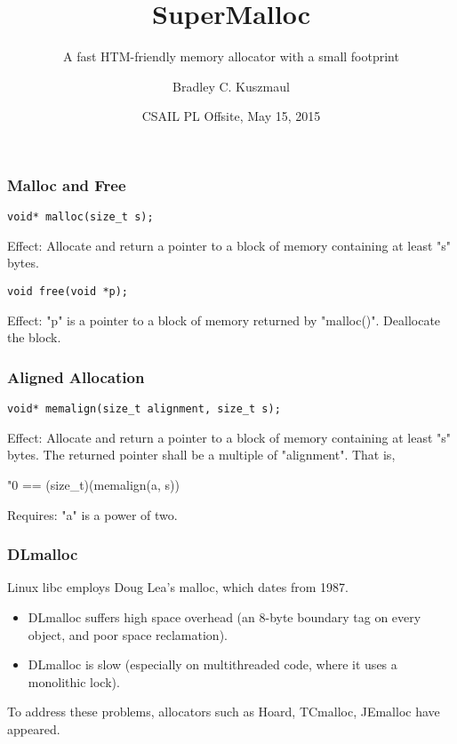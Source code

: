 \documentclass[xcolor=dvipsnames,14pt]{beamer}
\begin{document}
\title{SuperMalloc}
\subtitle{A fast HTM-friendly memory allocator with a small footprint}

\author{Bradley C. Kuszmaul}
\date{CSAIL PL Offsite, May  15, 2015}
\frame{\titlepage}

\begin{frame}[fragile]
\frametitle{Malloc and Free}
\begin{verbatim}
void* malloc(size_t s);
\end{verbatim}

Effect: Allocate and return a pointer to a block of memory containing at least "s" bytes.

\begin{verbatim}
void free(void *p);
\end{verbatim}

Effect: "p" is a pointer to a block of memory returned by "malloc()".  Deallocate the block.
\end{frame}

\begin{frame}[fragile]
\frametitle{Aligned Allocation}

\begin{verbatim}
void* memalign(size_t alignment, size_t s);
\end{verbatim}


Effect: Allocate and return a pointer to a block of memory containing at least "s" bytes.  
The returned pointer shall be a multiple of "alignment".  That is,
\begin{center}
"0 == (size_t)(memalign(a, s)) %
\end{center}

Requires: "a" is a power of two.
\end{frame}

\begin{frame}
\frametitle{DLmalloc}

Linux libc employs Doug Lea's malloc, which dates from 1987.

\begin{itemize}
\item DLmalloc suffers high space overhead (an 8-byte boundary tag on every object, and poor space reclamation).
\item DLmalloc is slow (especially on multithreaded code, where it uses a monolithic lock).
\end{itemize}

To address these problems, allocators such as Hoard, TCmalloc, JEmalloc have appeared.

\end{frame}
\end{document}
